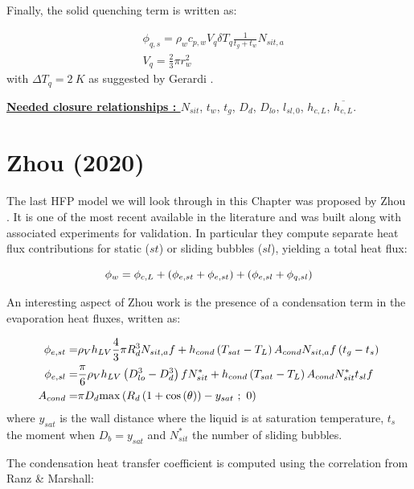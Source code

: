 Finally, the solid quenching term is written as:

\begin{align}
& \phi_{q,s} = \rho_{w} c_{p,w} V_{q} \delta T_{q} \frac{1}{t_{g}+t_{w}} N_{sit,a}\\
%
& V_{q} = \frac{2}{3} \pi r_{w}^{2}
\end{align}
with $\Delta T_{q}=2\ K$ as suggested by Gerardi \etal \cite{Gerardi_etal}.

\npar

\textbf{\underline{Needed closure relationships : }} $N_{sit}$, $t_{w}$, $t_{g}$, $D_{d}$, $D_{lo}$, $l_{sl,0}$, $h_{c,L}$, $\overline{h_{c,L}}$. 



\section{Zhou (2020)}

The last HFP model we will look through in this Chapter was proposed by Zhou \etal \cite{zhou}. It is one of the most recent available in the literature and was built along with associated experiments for validation. In particular they compute separate heat flux contributions for static ($st$) or sliding bubbles ($sl$), yielding a total heat flux:

\begin{equation}
\phi_{w} = \phi_{c,L} + \left( \phi_{e,st}+ \phi_{e,st} \right) + \left( \phi_{e,sl}+\phi_{q,sl} \right)
\end{equation}

An interesting aspect of Zhou \etal work is the presence of a condensation term in the evaporation heat fluxes, written as:

\begin{align}
\phi_{e,st} =& \rho_{V}h_{LV}\frac{4}{3}\pi R_{d}^{3} N_{sit,a} f  + h_{cond}\parth{T_{sat}-T_{L}}A_{cond} N_{sit,a} f \parth{t_{g}-t_{s}} \\
%
\phi_{e,sl} =& \frac{\pi}{6}\rho_{V}h_{LV}\parth{D_{lo}^{3}-D_{d}^{3}}fN_{sit}^{*} + h_{cond} \parth{T_{sat}-T_{L}}A_{cond}N_{sit}^{*}t_{sl}f\\
%
A_{cond} =& \pi D_{d} \mathrm{max}\parth{R_{d}\parth{1+\cos{\theta}}-y_{sat}\ ;\ 0}
\end{align}
where $y_{sat}$ is the wall distance where the liquid is at saturation temperature, $t_{s}$ the moment when $D_{b}=y_{sat}$ and $N_{sit}^{*}$ the number of sliding bubbles.

The condensation heat transfer coefficient is computed using the correlation from Ranz \& Marshall:


